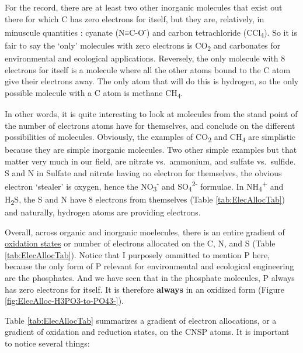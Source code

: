 \documentclass[]{book}
\theoremstyle{definition}
\theoremstyle{definition}
\theoremstyle{definition}
\theoremstyle{remark}
\begin{document}
For the record, there are at least two other inorganic molecules that
exist out there for which C has zero electrons for itself, but they are,
relatively, in minuscule quantities : cyanate (N≡C-O\textsuperscript{-})
and carbon tetrachloride (CCl\textsubscript{4}). So it is fair to say
the `only' molecules with zero electrons is CO\textsubscript{2} and
carbonates for environmental and ecological applications. Reversely, the
only molecule with 8 electrons for itself is a molecule where all the
other atoms bound to the C atom give their electrons away. The only atom
that will do this is hydrogen, so the only possible molecule with a C
atom is methane CH\textsubscript{4}.

In other words, it is quite interesting to look at molecules from the
stand point of the number of electrons atoms have for themselves, and
conclude on the different possibilities of molecules. Obviously, the
examples of CO\textsubscript{2} and CH\textsubscript{4} are simplistic
because they are simple inorganic molecules. Two other simple examples
but that matter very much in our field, are nitrate vs.~ammonium, and
sulfate vs.~sulfide. S and N in Sulfate and nitrate having no electron
for themselves, the obvious electron `stealer' is oxygen, hence the
NO\textsubscript{3}\textsuperscript{-} and
SO\textsubscript{4}\textsuperscript{2-} formulae. In
NH\textsubscript{4}\textsuperscript{+} and H\textsubscript{2}S, the S
and N have 8 electrons from themselves (Table \ref{tab:ElecAllocTab})
and naturally, hydrogen atoms are providing electrons.

Overall, across organic and inorganic moelecules, there is an entire
gradient of \protect\hyperlink{oxidation-state}{oxidation states} or
number of electrons allocated on the C, N, and S (Table
\ref{tab:ElecAllocTab}). Notice that I purposely ommitted to mention P
here, because the only form of P relevant for environmental and
ecological engineering are the phosphates. And we have seen that in the
phosphate molecules, P always has zero electrons for itself. It is
therefore \textbf{always} in an oxidized form (Figure
\ref{fig:ElecAlloc-H3PO3-to-PO43-}).

Table \ref{tab:ElecAllocTab} summarizes a gradient of electron
allocations, or a gradient of oxidation and reduction states, on the
CNSP atoms. It is important to notice several things:
\end{document}
